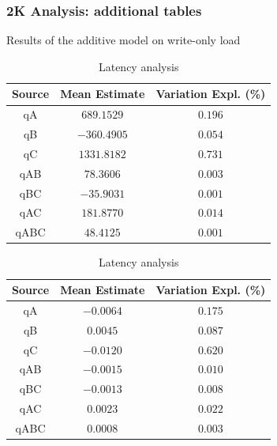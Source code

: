 \documentclass[11pt,a4paper]{article}
\begin{document}
\subsubsection*{2K Analysis: additional tables} \label{sec:app-2k-analysis-add-plots}
\begin{table}[h]
\centering
{Results of the additive model on write-only load}
\begin{minipage}{.5\textwidth}
\centering
	\begin{tabular}{|c|c|c|}
	\hline 
	{\small Source} & {\small Mean Estimate} & {\small Variation Expl. (\%)} \\ 
	\hline 
	qA & $689.1529$ & $0.196$ \\ 
	\hline 
	qB & $-360.4905$ & $0.054$ \\ 
	\hline 
	qC & $1331.8182$ & $0.731$ \\ 
	\hline 
	qAB & $78.3606$ & $0.003$ \\ 
	\hline 
	qBC & $-35.9031$ & $0.001$ \\ 
	\hline 
	qAC & $181.8770$ & $0.014$ \\ 
	\hline 
	qABC & $48.4125$ & $0.001$ \\ 
	\hline 
	\end{tabular} \caption{Throughput analysis} \label{tab:2k-add-wo-tpt}
\end{minipage}%
\begin{minipage}{.5\textwidth}
\centering
	\begin{tabular}{|c|c|c|}
	\hline 
	{\small Source} & {\small Mean Estimate} & {\small Variation Expl. (\%)} \\ 
	\hline 
	qA & $-0.0064$ & $0.175$ \\ 
	\hline 
	qB & $0.0045$ & $0.087$ \\ 
	\hline 
	qC & $-0.0120$ & $0.620$ \\ 
	\hline 
	qAB & $-0.0015$ & $0.010$ \\ 
	\hline 
	qBC & $-0.0013$ & $0.008$ \\ 
	\hline 
	qAC & $0.0023$ & $0.022$ \\ 
	\hline 
	qABC & $0.0008$ & $0.003$ \\ 
	\hline 
	\end{tabular} \caption{Latency analysis} \label{tab:2k-add-wo-lat}
\end{minipage}
\end{table}\label{tab:2k-add-wo}
\end{document}
